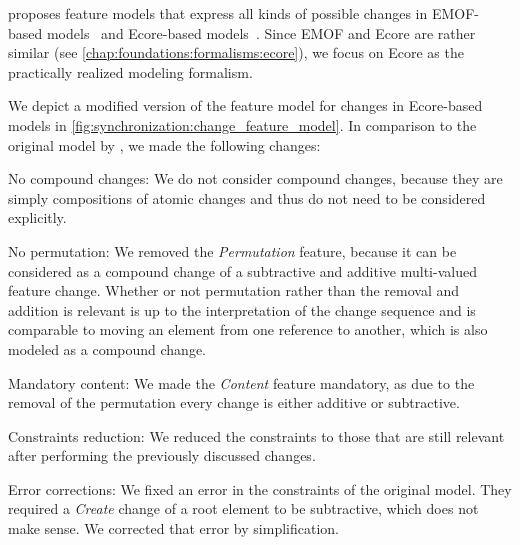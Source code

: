 \citeauthor{kramer2017a} proposes feature models that express all kinds of possible changes in \gls{EMOF}-based models~\cite[Fig. 5.2]{kramer2017a} and Ecore-based models~\cite[Fig.~5.3]{kramer2017a}.
Since \gls{EMOF} and Ecore are rather similar (see \autoref{chap:foundations:formalisms:ecore}), we focus on Ecore as the practically realized modeling formalism.

We depict a modified version of the feature model for changes in Ecore-based models in \autoref{fig:synchronization:change_feature_model}.
In comparison to the original model by \textcite[Fig. 5.3]{kramer2017a}, we made the following changes:
\begin{properdescription}
    \item[No compound changes:] We do not consider compound changes, because they are simply compositions of atomic changes and thus do not need to be considered explicitly.
    \item[No permutation:] We removed the \emph{Permutation} feature, because it can be considered as a compound change of a subtractive and additive multi-valued feature change. Whether or not permutation rather than the removal and addition is relevant is up to the interpretation of the change sequence and is comparable to moving an element from one reference to another, which is also modeled as a compound change.
    \item[Mandatory content:] We made the \emph{Content} feature mandatory, as due to the removal of the permutation every change is either additive or subtractive.
    \item[Constraints reduction:] We reduced the constraints to those that are still relevant after performing the previously discussed changes.
    \item[Error corrections:] We fixed an error in the constraints of the original model. They required a \emph{Create} change of a root element to be subtractive, which does not make sense. We corrected that error by simplification.
\end{properdescription}

